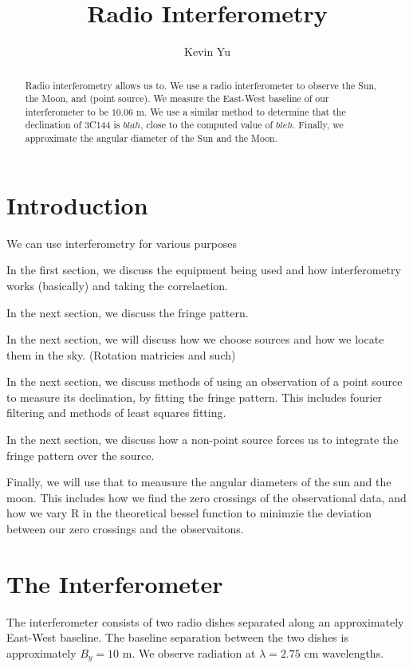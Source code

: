 \documentclass[12pt]{article}
\title{Radio Interferometry}
\author {
Kevin Yu
}
\begin{document}
\maketitle

\begin{abstract}
Radio interferometry allows us to.  We use a radio interferometer to observe the Sun, the Moon, and (point source). We measure the East-West baseline of our interferometer to be $10.06$ m. We use a similar method to determine that the declination of 3C144 is $blah$, close to the computed value of $bleh$. Finally, we approximate the angular diameter of the Sun and the Moon.
\end{abstract}

\section{Introduction}
We can use interferometry for various purposes

In the first section, we discuss the equipment being used and how interferometry works (basically) and taking the correlaetion.

In the next section, we discuss the fringe pattern.

In the next section, we will discuss how we choose sources and how we locate them in the sky. (Rotation matricies and such)

In the next section, we discuss methods of using an observation of a point source to measure its declination, by fitting the fringe pattern. This includes fourier filtering and methods of least squares fitting. 

In the next section, we discuss how a non-point source forces us to integrate the fringe pattern over the source.

Finally, we will use that to meausure the angular diameters of the sun and the moon. This includes how we find the zero crossings of the observational data, and how we vary R in the theoretical bessel function to minimzie the deviation between our zero crossings and the observaitons.

\section{The Interferometer}
The interferometer consists of two radio dishes separated along an approximately East-West baseline. The baseline separation between the two dishes is approximately $B_y = 10$ m. We observe radiation at $\lambda = 2.75$ cm wavelengths.
\end{document}
